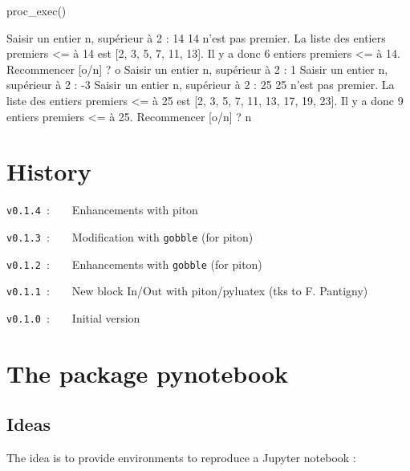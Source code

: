 \documentclass[english,11pt,a4paper]{article}
\begin{document}
\begin{NotebookIn}{\linewidth}
proc_exec()
\end{NotebookIn}

\begin{NotebookConsole}{\linewidth}
Saisir un entier n, supérieur à 2 : 14
14 n'est pas premier.
La liste des entiers premiers <= à 14 est [2, 3, 5, 7, 11, 13].
Il y a donc 6 entiers premiers <= à 14.
Recommencer [o/n] ? o
Saisir un entier n, supérieur à 2 : 1
Saisir un entier n, supérieur à 2 : -3
Saisir un entier n, supérieur à 2 : 25
25 n'est pas premier.
La liste des entiers premiers <= à 25 est [2, 3, 5, 7, 11, 13, 17, 19, 23].
Il y a donc 9 entiers premiers <= à 25.
Recommencer [o/n] ? n
\end{NotebookConsole}
%
%

\pagebreak

\section{History}

\verb|v0.1.4|~:~~~~Enhancements with \textsf{piton}

\verb|v0.1.3|~:~~~~Modification with \texttt{gobble} (for \textsf{piton})

\verb|v0.1.2|~:~~~~Enhancements with \texttt{gobble} (for \textsf{piton})

\verb|v0.1.1|~:~~~~New block \textsf{In/Out} with \textsf{piton/pyluatex} (tks to F. Pantigny)

\verb|v0.1.0|~:~~~~Initial version

\vspace*{15mm}

\pagebreak

\section{The package pynotebook}

\subsection{Ideas}

The idea is to provide environments to reproduce a Jupyter notebook :
\end{document}
